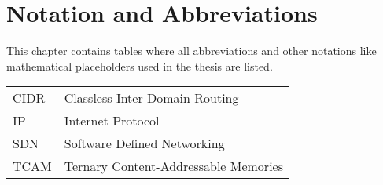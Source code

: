 \chapter{Notation and Abbreviations}
This chapter contains tables where all abbreviations and other notations like mathematical
placeholders used in the thesis are listed.
\begin{table}[h]
\begin{tabular}{ll}
CIDR & Classless Inter-Domain Routing\\
IP & Internet Protocol\\
SDN & Software Defined Networking\\
TCAM & Ternary Content-Addressable Memories\\
\end{tabular}
\end{table}

